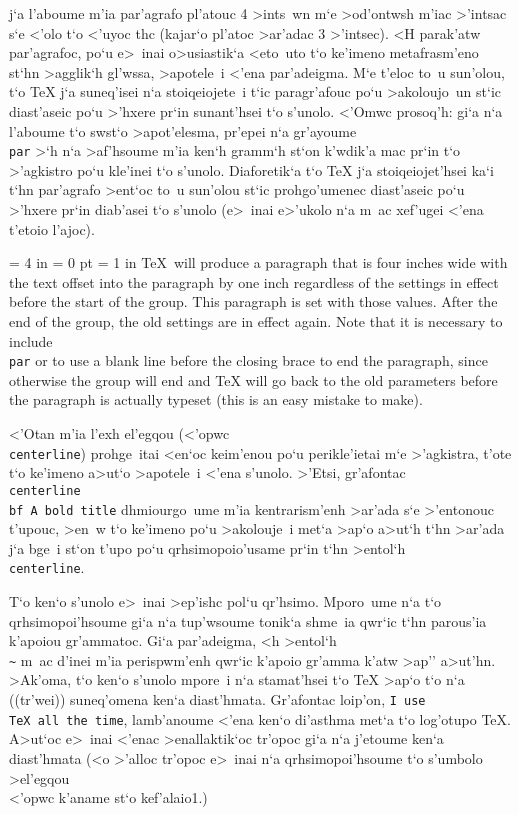 \noindent 
j`a l'aboume m'ia par'agrafo pl'atouc 4 >ints~wn m`e >od'ontwsh m'iac
>'intsac s`e <'olo t`o <'uyoc thc (ka\-ja\-r`o pl'atoc >ar'adac 3
>'intsec).  <H parak'atw par'agrafoc, po`u e>~inai o>usiastik`a <eto~uto
t`o ke'imeno metafrasm'eno st`hn >agglik`h gl'wssa, >apotele~i <'ena
par'adeigma. M`e t'eloc to~u sun'olou, t`o {\rm \TeX} j`a suneq'isei n`a
stoiqeiojete~i t`ic paragr'afouc po`u >akoloujo~un st`ic dia\-st'a\-seic
po`u >'hxere pr`in sunant'hsei t`o s'unolo. <'Omwc prosoq'h: gi`a n`a
l'aboume t`o swst`o >apot'elesma, pr'epei n`a gr'a\-you\-me {\tt \\par}
>`h n`a >af'hsoume m'ia ken`h gramm`h st`on k'wdik'a mac pr`in t`o
>'agkistro {\tt\rb} po`u kle'inei t`o s'unolo.  Dia\-fore\-tik`a t`o
{\rm \TeX} j`a stoiqeiojet'hsei ka`i t`hn par'agrafo >ent`oc to~u
sun'olou st`ic prohgo'umenec diast'aseic po`u >'hxere pr`in diab'asei
t`o s'unolo (e>~inai e>'ukolo n`a m~ac xef'ugei <'ena t'etoio l'ajoc).

{\hsize = 4 in
\parindent = 0 pt
\leftskip = 1 in \rm
\TeX\ will produce a paragraph that is four inches wide with the text
offset into the paragraph by one inch regardless of the settings in
effect before the start of the group.  This paragraph is set with those
values. After the end of the group, the old settings are in effect
again. Note that it is necessary to include {\tt \\par} or to use a
blank line before the closing brace to end the paragraph, since
otherwise the group will end and \TeX{} will go back to the old
parameters before the paragraph is actually typeset (this is an easy
mistake to make). \par}

<'Otan m'ia l'exh el'egqou (<'opwc {\tt \\centerline}) prohge~itai
<en`oc keim'enou po`u perikle'ietai m`e >'agkistra, t'ote t`o ke'imeno
a>ut`o >apotele~i <'ena s'unolo.  >'Etsi, gr'afontac {\tt
\\centerline\lb\\bf A bold title\rb} dhmiourgo~ume m'ia kentrarism'enh
>ar'ada s`e >'entonouc t'u\-pouc, >en~w t`o ke'imeno po`u >akolouje~i
met`a >ap`o a>ut`h t`hn >ar'ada j`a bge~i st`on t'upo po`u
qrhsi\-mo\-poio'usame pr`in t`hn >entol`h {\tt \\centerline}.

T`o ken`o s'unolo {\tt\lb\rb} e>~inai >ep'ishc pol`u qr'hsimo. 
Mporo~ume n`a t`o qrhsimopoi'hsoume gi`a n`a tup'wsoume tonik`a shme~ia
qwr`ic t`hn parous'ia k'apoiou gr'ammatoc.  Gi`a par'adeigma, <h
>entol`h {\tt \\\~{}\lb\rb} m~ac d'inei m'ia perispwm'enh qwr`ic k'apoio
gr'amma k'atw >ap'' a>ut'hn.  >Ak'oma, t`o ken`o s'unolo mpore~i n`a
stamat'hsei t`o {\rm \TeX} >ap`o t`o n`a ((tr'wei)) suneq'omena ken`a
diast'hmata.  Gr'a\-fo\-ntac loip'on, {\tt I use \\TeX\lb\rb{} all the  
time}, lamb'anoume <'ena ken`o di'asthma met`a t`o log'otupo
{\rm\TeX}\null. A>ut`oc e>~inai <'enac >enallaktik`oc tr'opoc gi`a n`a
j'etoume ken`a diast'hmata (<o >'alloc tr'opoc e>~inai n`a
qrhsimopoi'hsoume t`o s'umbolo >el'egqou {\tt \\\sp} <'opwc k'aname st`o
kef'alaio\NB{}1.)%

